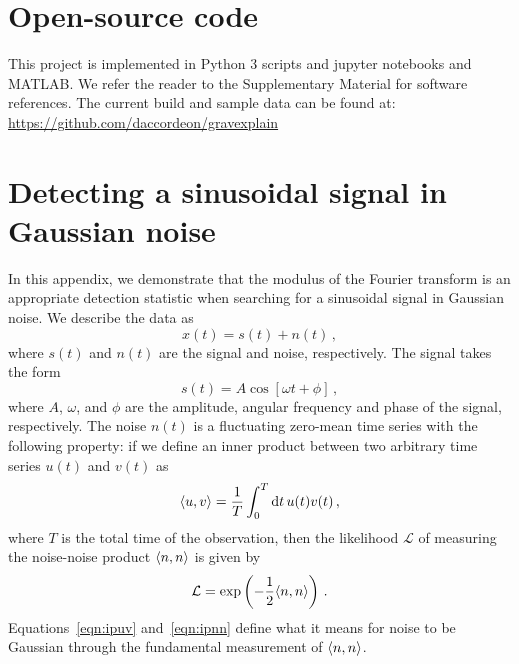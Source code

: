 \documentclass[paper-main.tex]{subfiles}
\begin{document}
\section{Open-source code}
\label{app:code}
This project is implemented in Python 3 scripts and jupyter notebooks and MATLAB. 
We refer the reader to the Supplementary Material for software references. 
The current build and sample data can be found at:
\url{https://github.com/daccordeon/gravexplain}







\section{Detecting a sinusoidal signal in Gaussian noise}
\label{app:sinusoid_likelihood}


In this appendix, we demonstrate that the modulus of the Fourier transform is an appropriate detection statistic when searching for a sinusoidal signal in Gaussian noise. 
We describe the data as
\begin{equation}
x(t) = s(t) + n(t)\,, 
\label{eqn:GNdata}
\end{equation}
where $s(t)$ and $n(t)$ are the signal and noise, respectively.
The signal takes the form
\begin{equation}
s(t) = A \cos\left[{\omega t + \phi}\right]\,,
\label{eqn:GNmodel}
\end{equation}
where $A$, $\omega$, and $\phi$ are the amplitude, angular frequency and phase of the signal, respectively. 
The noise $n(t)$ is a fluctuating zero-mean time series with the following property: if we define an inner product between two arbitrary time series $u(t)$ and $v(t)$ as 
\begin{equation}
\langle u,v \rangle = \frac{1}{T} \int_0^T \mathrm{d} t \, u(t) v(t)\,,
\label{eqn:ipuv}
\end{equation}
where $T$ is the total time of the observation, then the likelihood $\mathcal{L}$ of measuring the noise-noise product $\langle n,n \rangle$ is given by 
\begin{equation}
\mathcal{L} = \exp\left( -\frac{1}{2}\langle n,n \rangle\right)\,.
\label{eqn:ipnn}
\end{equation}
Equations~\ref{eqn:ipuv} and~\ref{eqn:ipnn} define what it means for noise to be Gaussian through the fundamental measurement of $\langle n,n \rangle$.
\end{document}
